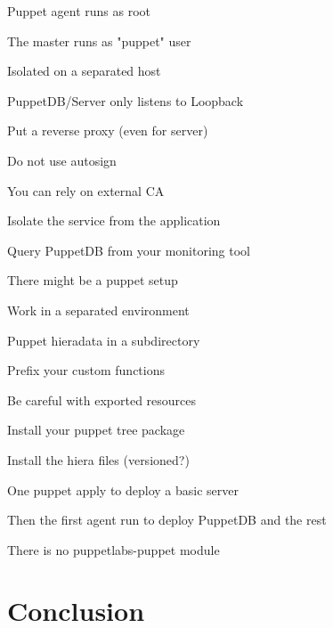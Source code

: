 \begin{iframe}[Security]
\item Puppet agent runs as root
\item The master runs as "puppet" user
\item Isolated on a separated host
\item PuppetDB/Server only listens to Loopback
\item Put a reverse proxy (even for server)
\end{iframe}

\begin{iframe}
\item Do not use autosign
\item You can rely on external CA
\item Isolate the service from the application
\item Query PuppetDB from your monitoring tool
\end{iframe}




\begin{iframe}
\item There might be a puppet setup
\item Work in a separated environment
\item Puppet hieradata in a subdirectory
\item Prefix your custom functions
\item Be careful with exported resources
\end{iframe}

\begin{iframe}
\item Install your puppet tree package
\item Install the hiera files (versioned?)
\item One puppet apply to deploy a basic server
\item Then the first agent run to deploy PuppetDB and the rest
\item There is no puppetlabs-puppet module
\end{iframe}
\section{Conclusion}


